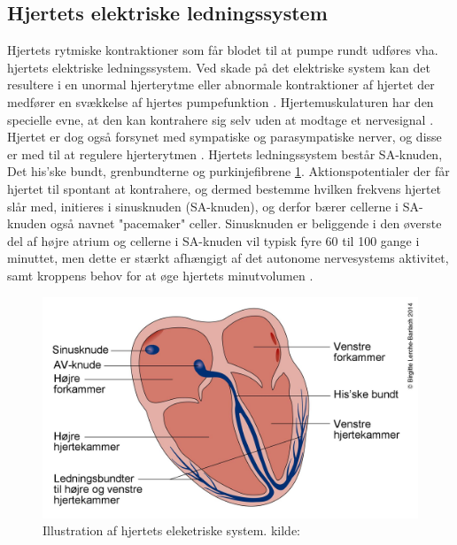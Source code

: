 \subsection{Hjertets elektriske ledningssystem}\label{Hjertets_elektriske_ledningssystem}
Hjertets rytmiske kontraktioner som får blodet til at pumpe rundt udføres vha. hjertets elektriske ledningssystem. Ved skade på det elektriske system kan det resultere i en unormal hjerterytme eller abnormale kontraktioner af hjertet der medfører en svækkelse af hjertes pumpefunktion \cite{guyton}. Hjertemuskulaturen har den specielle evne, at den kan kontrahere sig selv uden at modtage et nervesignal \cite{gronanatomi}. Hjertet er dog også forsynet med sympatiske og parasympatiske nerver, og disse er med til at regulere hjerterytmen \cite{cindy}. 
Hjertets ledningssystem består SA-knuden, Det his'ske bundt, grenbundterne og purkinjefibrene \ref{fig:hjerte_elektriske}.
Aktionspotentialer der får hjertet til spontant at kontrahere, og dermed bestemme hvilken frekvens hjertet slår med, initieres i sinusknuden (SA-knuden), og derfor bærer cellerne i SA-knuden også navnet "pacemaker" celler.
Sinusknuden er beliggende i den øverste del af højre atrium og cellerne i SA-knuden vil typisk fyre 60 til 100 gange i minuttet, men dette er stærkt afhængigt af det autonome nervesystems aktivitet, samt kroppens behov for at øge hjertets
minutvolumen \cite{ekgbook}.

\begin{figure}[H] %
\begin{center}
\includegraphics[width=1\linewidth]{figures/hjerte_elektrisk}
\end{center}
\caption{Illustration af hjertets eleketriske system. kilde: \cite{elektriske}}
\label{fig:hjerte_elektriske}
\end{figure}

